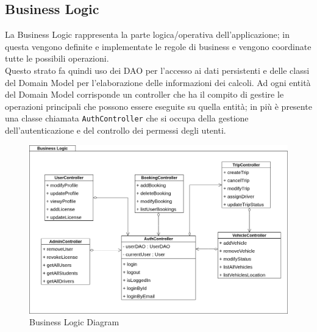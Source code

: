\subsection{Business Logic}\label{subsec:BL}
La Business Logic rappresenta la parte logica/operativa dell'applicazione; in questa vengono definite e implementate le regole di business e vengono coordinate tutte le possibili operazioni.\\
Questo strato fa quindi uso dei DAO per l'accesso ai dati persistenti e delle classi del Domain Model per l'elaborazione delle informazioni dei calcoli.
Ad ogni entità del Domain Model corrisponde un controller che ha il compito di gestire le operazioni principali che possono essere eseguite su quella entità; in più è presente una classe chiamata \texttt{AuthController} che si occupa della gestione dell'autenticazione e del controllo dei permessi degli utenti.
\begin{figure}[H]
    \centering
    \includegraphics[width=1.1\linewidth]{Images/BusinessLogic_diag.png}
    \caption{Business Logic Diagram}
    \label{fig:BLdiag}
\end{figure}

